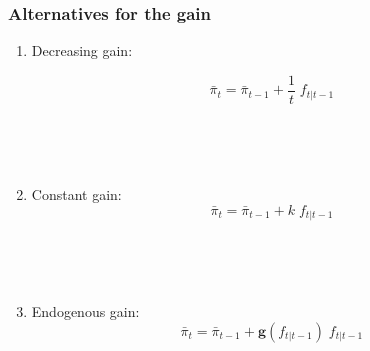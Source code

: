 \documentclass[10pt]{beamer}
\begin{document}
\begin{frame}
	\frametitle{ Alternatives for the gain }
	\label{cgain_dgain}

\begin{enumerate}
\item Decreasing gain:

\begin{equation}
\bar{\pi}_{t}  =\bar{\pi}_{t-1} +\frac{1}{t} \; f_{t|t-1}
\end{equation}

 
 



 \
 

 
 \
 
 \item Constant gain:
\begin{equation}
\bar{\pi}_{t}  =\bar{\pi}_{t-1} +k \; f_{t|t-1}
\end{equation}
 




  
    
 \pause
 
 \
 
 \
 
 \item Endogenous gain:
 \begin{equation}
\bar{\pi}_{t}  =\bar{\pi}_{t-1} +\mathbf{g}(f_{t|t-1}) \; f_{t|t-1}
\end{equation}

 

\vfill 

\hfill \hyperlink{ass_g}{}

\end{enumerate}
	




\end{frame}
\end{document}
